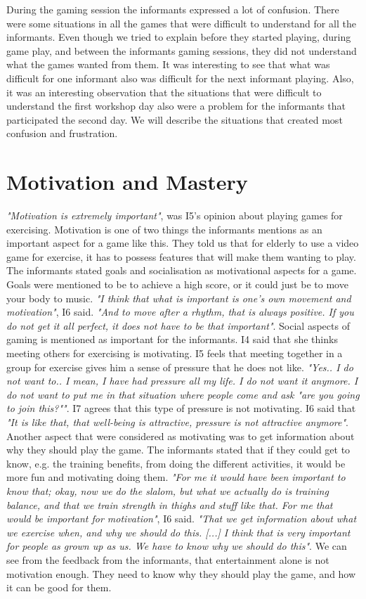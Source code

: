 During the gaming session the informants expressed a lot of confusion. There were some situations in all the games that were difficult to understand for all the informants. Even though we tried to explain before they started playing, during game play, and between the informants gaming sessions, they did not understand what the games wanted from them. It was interesting to see that what was difficult for one informant also was difficult for the next informant playing. Also, it was an interesting observation that the situations that were difficult to understand the first workshop day also were a problem for the informants that participated the second day. We will describe the situations that created most confusion and frustration.   

\section{Motivation and Mastery}

\emph{"Motivation is extremely important"}, was I5's opinion about playing games for exercising. Motivation is one of two things the informants mentions as an important aspect for a game like this. They told us that for elderly to use a video game for exercise, it has to possess features that will make them wanting to play. The informants stated goals and socialisation as motivational aspects for a game. Goals were mentioned to be to achieve a high score, or it could just be to move your body to music. \emph{"I think that what is important is one's own movement and motivation"}, I6 said. \emph{"And to move after a rhythm, that is always positive. If you do not get it all perfect, it does not have to be that important"}. Social aspects of gaming is mentioned as important for the informants. I4 said that she thinks meeting others for exercising is motivating. I5 feels that meeting together in a group for exercise gives him a sense of pressure that he does not like. \emph{"Yes.. I do not want to.. I mean, I have had pressure all my life. I do not want it anymore. I do not want to put me in that situation where people come and ask "are you going to join this?""}. I7 agrees that this type of pressure is not motivating. I6 said that \emph{"It is like that, that well-being is attractive, pressure is not attractive anymore"}.  Another aspect that were considered as motivating was to get information about why they should play the game. The informants stated that if they could get to know, e.g. the training benefits, from doing the different activities, it would be more fun and motivating doing them. \emph{"For me it would have been important to know that; okay, now we do the slalom, but what we actually do is training balance, and that we train strength in thighs and stuff like that. For me that would be important for motivation"}, I6 said. \emph{"That we get information about what we exercise when, and why we should do this. [...] I think that is very important for people as grown up as us. We have to know why we should do this"}. We can see from the feedback from the informants, that entertainment alone is not motivation enough. They need to know why they should play the game, and how it can be good for them. 

